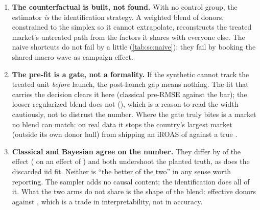 \begin{enumerate}[leftmargin=*, itemsep=.45em]
  \item \textbf{The counterfactual is built, not found.} With no control group, the estimator
        \emph{is} the identification strategy. A weighted blend of donors, constrained to the
        simplex so it cannot extrapolate, reconstructs the treated market's untreated path from
        the factors it shares with everyone else. The naive shortcuts do not fail by a little
        (\cref{tab:sc:naive}); they fail by booking the shared macro wave as campaign effect.

  \item \textbf{The pre-fit is a gate, not a formality.} If the synthetic cannot track the
        treated unit \emph{before} launch, the post-launch gap means nothing. The fit that carries
        the decision clears it here (classical pre-RMSE \keur{\nbSevenClPreRmse} against the
        \keur{\nbSevenGateRef} bar); the looser regularized blend does not
        (\keur{\nbSevenBayesPreRmse}), which is a reason to read the width cautiously, not to
        distrust the number. Where the gate truly bites is a market no blend can match: on real data
        it stops the country's largest market (outside its own donor hull) from shipping an iROAS of
        \nbSevenBHullIroas{} against a true \nbSevenBDidIroas{}.

  \item \textbf{Classical and Bayesian agree on the number.} They differ by
        \pc{\nbSevenEstDiffPct} of the effect (\keur{\nbSevenEstDiff} on an effect of
        \keur{\nbSevenTrueTotal}) and both undershoot the planted truth, as does the discarded
        iid fit. Neither is ``the better of the two'' in any sense worth reporting. The sampler
        adds no causal content; the identification does all of it. What the two arms do not share
        is the shape of the blend: \nbSevenClEffDonors{} effective donors against
        \nbSevenBayesEffDonors{}, which is a trade in interpretability, not in accuracy.


\end{enumerate}
